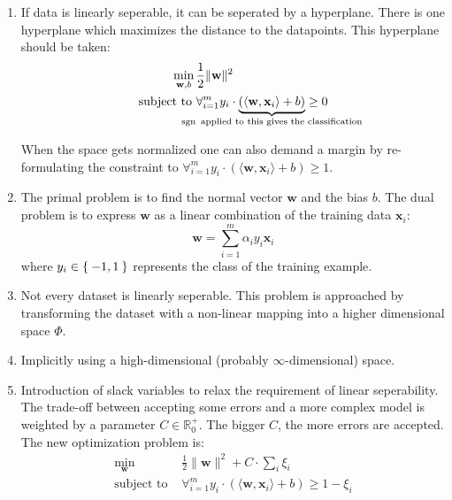 \begin{enumerate}
    \item If data is linearly seperable, it can be seperated by a hyperplane.
          There is one hyperplane which maximizes the distance to the
          datapoints. This hyperplane should be taken:\\
          \begin{equation*}
          \begin{aligned}
              \min_{\textbf{w}, b}\,&\frac{1}{2} \|\textbf{w}\|^2\\
              \text{subject to }& \forall_{i=1}^m y_i \cdot \underbrace{(\langle \textbf{w}, \textbf{x}_i\rangle + b)}_{\mathclap{\sgn \text{ applied to this gives the classification}}} \geq 0
          \end{aligned}
          \end{equation*}

          When the space gets normalized one can also demand a margin by re-formulating
          the constraint to
          $\forall_{i=1}^m y_i \cdot (\langle \textbf{w}, \textbf{x}_i\rangle + b) \geq 1$.
    \item The primal problem is to find the normal vector $\textbf{w}$ and the
          bias $b$. The dual problem is to express $\textbf{w}$ as a linear
          combination of the training data $\textbf{x}_i$:
          \[\textbf{w} = \sum_{i=1}^m \alpha_i y_i \textbf{x}_i\]
          where $y_i \in \Set{-1, 1}$ represents the class of the training
          example.
    \item Not every dataset is linearly seperable. This problem is approached
          by transforming the dataset with a non-linear mapping into a higher
          dimensional space $\Phi$.
    \item Implicitly using a high-dimensional (probably $\infty$-dimensional)
          space. %
    \item Introduction of slack variables to relax the requirement of linear
          seperability. The trade-off between accepting some errors and a more
          complex model is weighted by a parameter $C \in \mathbb{R}_0^+$. The
          bigger $C$, the more errors are accepted. The new optimization
          problem is:
          \begin{equation*}
          \begin{aligned}
              \min_{\textbf{w}}\,&\frac{1}{2} \|\textbf{w}\|^2 + C \cdot \sum_{i} \xi_i\\
              \text{subject to }& \forall_{i=1}^m y_i \cdot (\langle \textbf{w}, \textbf{x}_i\rangle + b) \geq 1 - \xi_i
          \end{aligned}
          \end{equation*}
\end{enumerate}

